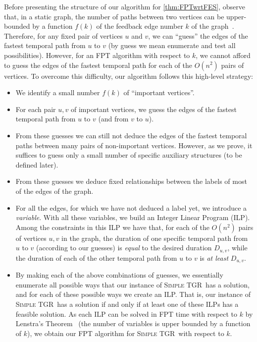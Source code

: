\documentclass[a4paper,UKenglish,cleveref, autoref, thm-restate]{lipics-v2021}
\newcommand{\ie}{i.\,e.,\ }
\newcommand{\deltaExact}{\textsc{Simple TGR}}
\begin{document}
Before presenting the structure of our algorithm for \cref{thm:FPTwrtFES}, observe that, in a static graph, the number of paths between two vertices can be upper-bounded by a function $f(k)$ of the feedback edge number $k$ of the graph~\cite{casteigts2021finding}. 
Therefore, for any fixed pair of vertices $u$ and $v$, we can ``guess'' the edges of the fastest temporal path from $u$ to $v$ (by guess we mean enumerate and test all possibilities).
However, 
for an FPT algorithm with respect to $k$, we cannot afford to guess the edges of the fastest temporal path for each of the $O(n^2)$ pairs of vertices. 
To overcome this difficulty, our algorithm follows this high-level strategy:
\begin{itemize}
    \item We identify a small number $f(k)$ of ``important vertices''.
    \item For each pair $u,v$ of important vertices, we guess the edges of the fastest temporal path from $u$ to $v$ (and from $v$ to $u$).
    \item From these guesses we can still not deduce the edges of the fastest temporal paths between many pairs of non-important vertices. However, as we prove, it suffices to guess only a small number of specific auxiliary structures (to be defined later).
    \item From these guesses we deduce fixed relationships between the labels of most of the edges of the graph. 
    \item For all the edges, for which we have not deduced a label yet, we introduce a \emph{variable}. With all these variables, we build an Integer Linear Program (ILP). 
    Among the constraints in this ILP we have that, for each of the $O(n^2)$ pairs of vertices $u,v$ in the graph, the duration of one specific temporal path from $u$ to $v$ (according to our guesses) is \emph{equal} to the desired duration $D_{u,v}$, while the duration of each of the other temporal path from $u$ to $v$ is \emph{at least} $D_{u,v}$.
    \item 
    By making each of the above combinations of guesses, we essentially enumerate all possible ways that our instance of \deltaExact\ has a solution, and for each of these possible ways we create an ILP. That is, our instance of \deltaExact\ has a solution if and only if at least one of these ILPs has a feasible solution.
    As each ILP can be solved in FPT time with respect to $k$ by Lenstra's Theorem~\cite{Lenstra1983Integer} (the number of variables is upper bounded by a function of $k$), we obtain our FPT algorithm for \deltaExact\ with respect to $k$.
\end{itemize}
\end{document}
